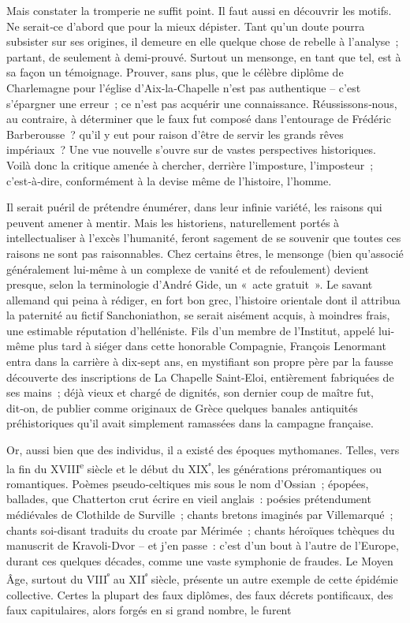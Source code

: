 \documentclass[french,twoside]{book} %
\begin{document}
\noindent  {}
\label{p43} Mais constater la tromperie ne suffit point. Il faut aussi en découvrir les motifs. Ne serait‑ce d’abord que pour la mieux dépister. Tant qu’un doute pourra subsister sur ses origines, il demeure en elle quelque chose de rebelle à l’analyse ; partant, de seulement à demi-prouvé. Surtout un mensonge, en tant que tel, est à sa façon un témoignage. Prouver, sans plus, que le célèbre diplôme de Charlemagne pour l’église d’Aix‑la‑Chapelle n’est pas authentique – c’est s’épargner une erreur ; ce n’est pas acquérir une connaissance. Réussissons‑nous, au contraire, à déterminer que le faux fut composé dans l’entourage de Frédéric Barberousse ? qu’il y eut pour raison d’être de servir les grands rêves impériaux ? Une vue nouvelle s’ouvre sur de vastes perspectives historiques. Voilà donc la critique amenée à chercher, derrière l’imposture, l’imposteur ; c’est‑à‑dire, confor­mément à la devise même de l’histoire, l’homme.\par
Il serait puéril de prétendre énumérer, dans leur infinie variété, les raisons qui peuvent amener à mentir. Mais les historiens, naturellement portés à intellectualiser à l’excès l’humanité, feront sagement de se sou­venir que toutes ces raisons ne sont pas raisonnables. Chez certains êtres, le mensonge (bien qu’associé généralement lui-même à un complexe de vanité et de refoulement) devient presque, selon la terminologie d’André Gide, un « acte gratuit ». Le savant allemand qui peina à rédiger, en fort bon grec, l’histoire orientale dont il attribua la paternité au fictif San­choniathon, se serait aisément acquis, à moindres frais, une estimable réputation d’helléniste. Fils d’un membre de l’Institut, appelé lui-même plus tard à siéger dans cette honorable Compagnie, François Lenormant entra dans la carrière à dix‑sept ans, en mystifiant son propre père par la fausse découverte des inscriptions de La Chapelle Saint‑Eloi, entière­ment fabriquées de ses mains ; déjà vieux et chargé de dignités, son dernier coup de maître fut, dit‑on, de publier comme originaux de Grèce quelques banales antiquités préhistoriques qu’il avait simplement ramassées dans la campagne française.\par
Or, aussi bien que des individus, il a existé des époques mythomanes. Telles, vers la fin du XVIII\textsuperscript{e} siècle et le début du XIX\textsuperscript{ᵉ}, les générations préromantiques ou romantiques. Poèmes pseudo‑celtiques mis sous le nom d’Ossian ; épopées, ballades, que Chatterton crut écrire en vieil anglais : poésies prétendument médiévales de Clothilde de Surville ; chants bretons imaginés par Villemarqué ; chants soi-disant traduits du croate par Mérimée ; chants héroïques tchèques du manuscrit de Kravoli-Dvor – et j’en passe : c’est d’un bout à l’autre de l’Europe, durant ces quelques décades, comme une vaste symphonie de fraudes. Le Moyen Âge, surtout du VIII\textsuperscript{ᵉ} au XII\textsuperscript{ᵉ} siècle, présente un autre exemple de cette épidémie collective. Certes la plupart des faux diplômes, des faux décrets ponti­ficaux, des faux capitulaires, alors forgés en si grand nombre, le furent  
\end{document}
